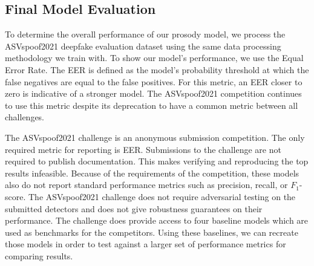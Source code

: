 \documentclass[10pt, journal, anonymous=true]{IEEEtran}
\begin{document}
\subsection{Final Model Evaluation}\label{sec:trans}

To determine the overall performance of our prosody model, we process the ASVspoof2021 deepfake evaluation dataset using the same data processing methodology we train with.
To show our model's performance, we use the Equal Error Rate. The EER is defined as the model's probability threshold at which the false negatives are equal to the false positives. For this metric, an EER closer to zero is indicative of a stronger model. The ASVspoof2021 competition continues to use this metric despite its deprecation to have a common metric between all challenges. 

The ASVspoof2021 challenge is an anonymous submission competition. The only required metric for reporting is EER. Submissions to the challenge are not required to publish documentation. This makes verifying and reproducing the top results infeasible. Because of the requirements of the 
competition, these models also do not report standard performance metrics such as precision, recall, or $F_1$-score. The ASVspoof2021 challenge does not require adversarial testing on the submitted detectors and does not give robustness guarantees on their performance. The challenge does provide access to four baseline models which are used as benchmarks for the competitors. Using these baselines, we can recreate those models in order to test against a larger set of performance metrics for comparing results.
\end{document}
